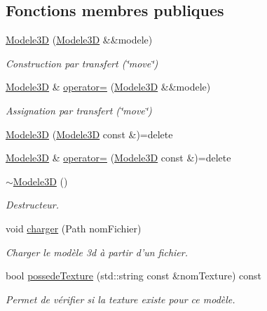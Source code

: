 \subsection*{Fonctions membres publiques}
\begin{DoxyCompactItemize}
\item 
\hyperlink{classmodele_1_1_modele3_d_a235e9fd8dddc14392f922fefaa11255a}{Modele3\-D} (\hyperlink{classmodele_1_1_modele3_d}{Modele3\-D} \&\&modele)
\begin{DoxyCompactList}\small\item\em Construction par transfert (\char`\"{}move\char`\"{}) \end{DoxyCompactList}\item 
\hyperlink{classmodele_1_1_modele3_d}{Modele3\-D} \& \hyperlink{classmodele_1_1_modele3_d_a34a330415e383970df2f479994f00dd6}{operator=} (\hyperlink{classmodele_1_1_modele3_d}{Modele3\-D} \&\&modele)
\begin{DoxyCompactList}\small\item\em Assignation par transfert (\char`\"{}move\char`\"{}) \end{DoxyCompactList}\item 
\hyperlink{classmodele_1_1_modele3_d_a1b028ca06d9bb0adda731be23de6d03b}{Modele3\-D} (\hyperlink{classmodele_1_1_modele3_d}{Modele3\-D} const \&)=delete
\item 
\hyperlink{classmodele_1_1_modele3_d}{Modele3\-D} \& \hyperlink{classmodele_1_1_modele3_d_af0336d4d17bb80b294b7b3d6212f94ba}{operator=} (\hyperlink{classmodele_1_1_modele3_d}{Modele3\-D} const \&)=delete
\item 
\hyperlink{classmodele_1_1_modele3_d_a1d3f1af73cee1aa3839dcd0eae9d1918}{$\sim$\-Modele3\-D} ()
\begin{DoxyCompactList}\small\item\em Destructeur. \end{DoxyCompactList}\item 
void \hyperlink{classmodele_1_1_modele3_d_aeb916b8eb492aef3aab86236773b81fb}{charger} (Path nom\-Fichier)
\begin{DoxyCompactList}\small\item\em Charger le modèle 3d à partir d'un fichier. \end{DoxyCompactList}\item 
bool \hyperlink{classmodele_1_1_modele3_d_a30920574e97a562609db9a2bde5df032}{possede\-Texture} (std\-::string const \&nom\-Texture) const 
\begin{DoxyCompactList}\small\item\em Permet de vérifier si la texture existe pour ce modèle. \end{DoxyCompactList}\item 

\end{DoxyCompactItemize}
